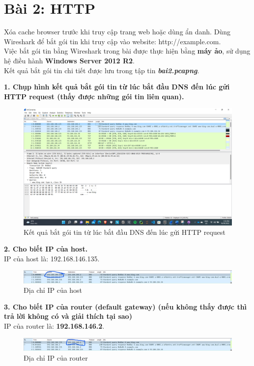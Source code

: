 \section{Bài 2: HTTP}
Xóa cache browser trước khi truy cập trang web hoặc dùng ẩn danh. Dùng Wireshark để bắt gói tin khi truy cập vào website: http://example.com.\\
Việc bắt gói tin bằng Wireshark trong bài được thực hiện bằng \textbf{máy ảo}, sử dụng hệ điều hành \textbf{Windows Server 2012 R2}.\\
Kết quả bắt gói tin chi tiết được lưu trong tập tin \textbf{\textit{bai2.pcapng}}.

\textbf{1. Chụp hình kết quả bắt gói tin từ lúc bắt đầu DNS đến lúc gửi HTTP request (thấy được những gói tin liên quan).}
\begin{figure}[H]
\begin{center}
\includegraphics[scale=.45]{../figures/p2/p2_intro}
\end{center}
\caption{Kết quả bắt gói tin từ lúc bắt đầu DNS đến lúc gửi HTTP request}
\end{figure}

\textbf{2.	Cho biết IP của host.}\\
IP của host là: 192.168.146.135.
\begin{figure}[H]
\begin{center}
\includegraphics[scale=1]{../figures/p2/p2_hostip}
\end{center}
\caption{Địa chỉ IP của host}
\end{figure}

\textbf{3. Cho biết IP của router (default gateway) (nếu không thấy được thì trả lời không có và giải thích tại sao)}\\
IP của router là: \textbf{192.168.146.2}.
\begin{figure}[H]
\begin{center}
\includegraphics[scale=1]{../figures/p2/p2_routerip}
\end{center}
\caption{Địa chỉ IP của router}
\end{figure}

